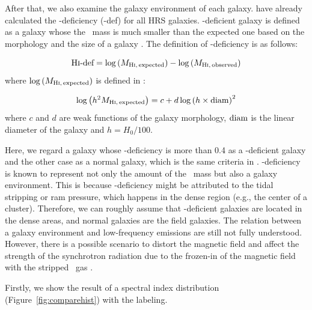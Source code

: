 After that, we also examine the galaxy environment of each galaxy.
\citet{Boselli2014} have already calculated the \nh-deficiency (\nh-def) for all HRS galaxies.
\nh-deficient galaxy is defined as a galaxy whose the \nh~mass is much smaller than the expected one based on the morphology and the size of a galaxy \citep{Haynes1984, Boselli2009}.
The definition of \nh-deficiency is as follows:

\begin{equation}\label{eq:definitionofHIdeficiency}
    \text{H\textsc{i}-def} = \log\left(M_{\mathrm{H\textsc{i},\,expected}}\right) - \log\left(M_{\mathrm{H\textsc{i},\,observed}}\right)
\end{equation}
where $\log\left(M_{\mathrm{H\textsc{i},\,expected}}\right)$ is defined in \citet{Haynes1984}:

\begin{equation}\label{eq:definitionofexpectedHIdef}
    \log\left(h^2 M_{\mathrm{H\textsc{i},\,expected}}\right) = c + d\log\left(h\times\mathrm{diam}\right)^2
\end{equation}
where $c$ and $d$ are weak functions of the galaxy morphology, $\mathrm{diam}$ is the linear diameter of the galaxy and $h=H_0 / 100$.

Here, we regard a galaxy whose \nh-deficiency is more than 0.4 as a \nh-deficient galaxy and the other case as a normal galaxy, which is the same criteria in \citet{Ciesla2016}.
\nh-deficiency is known to represent not only the amount of the \nh~mass but also a galaxy environment.
This is because \nh-deficiency might be attributed to the tidal stripping or ram pressure, which happens in the dense region (e.g., the center of a cluster).
Therefore, we can roughly assume that \nh-deficient galaxies are located in the dense areas, and normal galaxies are the field galaxies.
The relation between a galaxy environment and low-frequency emissions are still not fully understood.
However, there is a possible scenario to distort the magnetic field and affect the strength of the synchrotron radiation due to the frozen-in of the magnetic field with the stripped \nh~gas \citep{Murphy2009}.

Firstly, we show the result of a spectral index distribution (Figure~\ref{fig:comparehist}) with the labeling.

